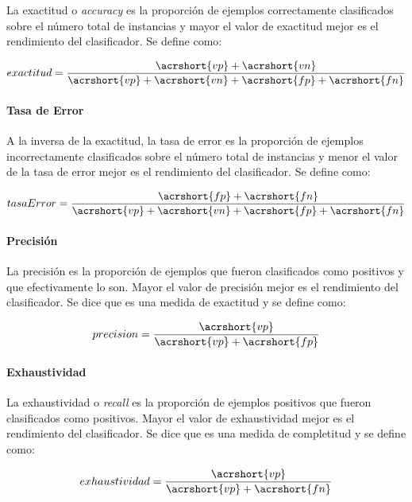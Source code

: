 La exactitud o \textit{accuracy} es la proporción de ejemplos correctamente
clasificados sobre el número total de instancias y mayor el valor de exactitud
mejor es el rendimiento del clasificador. Se define  como: 

\begin{equation}
   exactitud = \frac{\acrshort{vp} + \acrshort{vn}}{\acrshort{vp} +
   \acrshort{vn} + \acrshort{fp} + \acrshort{fn}}
\end{equation}

\paragraph{Tasa de Error}

A la inversa de la exactitud, la tasa de error es la proporción de ejemplos
incorrectamente clasificados sobre el número total de instancias y menor el
valor de la tasa de error mejor es el rendimiento del clasificador. Se define
como: 

\begin{equation}
   tasaError = \frac{\acrshort{fp} + \acrshort{fn}}{\acrshort{vp} +
   \acrshort{vn} + \acrshort{fp} + \acrshort{fn}}
\end{equation}

\paragraph{Precisión}

La precisión es la proporción de ejemplos que fueron clasificados como positivos
y que efectivamente lo son. Mayor el valor de precisión mejor es el rendimiento
del clasificador. Se dice que es una medida de exactitud y se define como: 

\begin{equation} 
   precision = \frac{\acrshort{vp}}{\acrshort{vp} + \acrshort{fp}}
\end{equation}

\paragraph{Exhaustividad}

La exhaustividad o \textit{recall} es la proporción de ejemplos positivos que
fueron clasificados como positivos. Mayor el valor de exhaustividad mejor es el
rendimiento del clasificador. Se dice que es una medida de completitud y se
define como: 

\begin{equation} 
   exhaustividad = \frac{\acrshort{vp}}{\acrshort{vp} + \acrshort{fn}} 
\end{equation}

